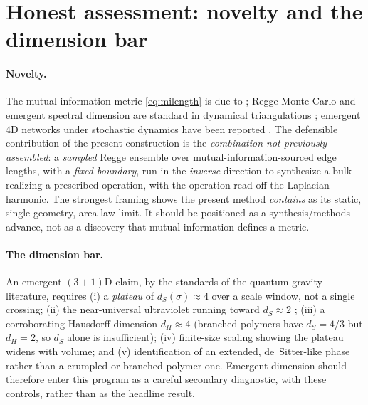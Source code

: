 \documentclass[11pt]{article}
\theoremstyle{definition}
\theoremstyle{plain}
\begin{document}
\section{Honest assessment: novelty and the dimension bar}
\label{sec:assessment}

\paragraph{Novelty.} The mutual-information metric \eqref{eq:milength} is due to
\cite{cao2017}; Regge Monte Carlo and emergent spectral dimension are standard in dynamical
triangulations \cite{ambjorn2005spectral}; emergent $4$D networks under stochastic dynamics
have been reported \cite{tee2020,trugenberger2015}. The defensible contribution of the
present construction is the \emph{combination not previously assembled}: a \emph{sampled}
Regge ensemble over mutual-information-sourced edge lengths, with a \emph{fixed boundary},
run in the \emph{inverse} direction to synthesize a bulk realizing a prescribed operation,
with the operation read off the Laplacian harmonic. The strongest framing shows the present
method \emph{contains} \cite{cao2017} as its static, single-geometry, area-law limit. It
should be positioned as a synthesis/methods advance, not as a discovery that mutual
information defines a metric.

\paragraph{The dimension bar.} An emergent-$(3{+}1)$D claim, by the standards of the
quantum-gravity literature, requires (i) a \emph{plateau} of $d_S(\sigma)\approx4$ over a
scale window, not a single crossing; (ii) the near-universal ultraviolet running toward
$d_S\approx2$ \cite{ambjorn2005spectral,carlip2017}; (iii) a corroborating Hausdorff
dimension $d_H\approx4$ (branched polymers have $d_S=4/3$ but $d_H=2$, so $d_S$ alone is
insufficient); (iv) finite-size scaling showing the plateau widens with volume; and (v)
identification of an extended, de~Sitter-like phase rather than a crumpled or
branched-polymer one. Emergent dimension should therefore enter this program as a careful
secondary diagnostic, with these controls, rather than as the headline result.
\end{document}
